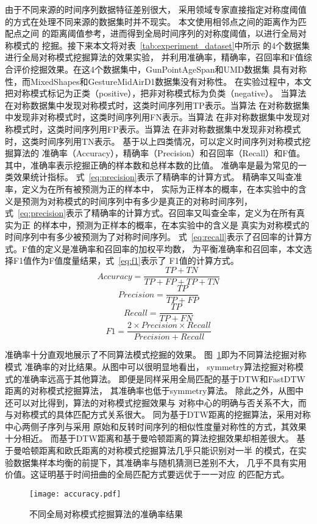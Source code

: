由于不同来源的时间序列数据特征差别很大，
采用领域专家直接指定对称度阈值的方式在处理不同来源的数据集时并不现实。
本文使用相邻点之间的距离作为匹配点之间
的距离阈值参考，进而得到全局时间序列的对称度阈值，以进行全局对称模式的
挖掘。接下来本文将对表~\ref{tab:experiment_dataset}中所示
的4个数据集进行全局对称模式挖掘算法的效果实验，
并利用准确率，精确率，召回率和F值综合评价挖掘效果。在这4个数据集中，GunPointAgeSpan和UMD数据集
具有对称性，而MixedShapes和GestureMidAirD1数据集没有对称性。
在实验过程中，本文把对称模式标记为正类（positive），把非对称模式标为负类（negative）。
当算法在对称数据集中发现对称模式时，这类时间序列用TP表示。当算法
在对称数据集中发现非对称模式时，这类时间序列用FN表示。当算法
在非对称数据集中发现对称模式时，这类时间序列用FP表示。当算法
在非对称数据集中发现非对称模式时，这类时间序列用TN表示。
基于以上四类情况，可以定义时间序列对称模式挖掘算法的
准确率（Accuracy），精确率（Precision）和召回率（Recall）和F值。
其中，准确率表示挖掘正确的样本数和总样本数的比值。
准确率是最为常见的一类效果统计指标。
式~\ref{eq:precision}表示了精确率的计算方式。
精确率又叫查准率，定义为在所有被预测为正的样本中，
实际为正样本的概率，在本实验中的含义是预测为对称模式的时间序列中有多少是真正的对称时间序列，
式~\ref{eq:precision}表示了精确率的计算方式。召回率又叫查全率，定义为在所有真实为正
的样本中，预测为正样本的概率，在本实验中的含义是
真实为对称模式的时间序列中有多少被预测为了对称时间序列。
式~\ref{eq:recall}表示了召回率的计算方式。F值的定义是准确率和召回率的加权平均数，
为平衡准确率和召回率，本文选择F1值作为F值度量结果，式~\ref{eq:f1}表示了
F1值的计算方式。
\begin{equation}
  Accuracy=\frac{TP+TN}{TP+FP+TP+TN}
  \label{eq:Accuracy}
\end{equation}
\begin{equation}
  Precision=\frac{TP}{TP+FP}
  \label{eq:precision}
\end{equation}
\begin{equation}
  Recall=\frac{TP}{TP+FN}
  \label{eq:recall}
\end{equation}
\begin{equation}
  F1=\frac{2 \times Precision \times Recall}{Precision+Recall}
  \label{eq:f1}
\end{equation}

准确率十分直观地展示了不同算法模式挖掘的效果。
图~\ref{fig:accuracy_compare}即为不同算法挖掘对称模式
准确率的对比结果。从图中可以很明显地看出，
symmetry算法挖掘对称模式的准确率远高于其他算法。
即便是同样采用全局匹配的基于DTW和FastDTW距离的对称模式挖掘算法，
其准确率也低于symmetry算法。
除此之外，从图中还可以对比得到，算法的对称模式挖掘效果与
对称中心的明确与否关系不大，而与对称模式的具体匹配方式关系很大。
同为基于DTW距离的挖掘算法，采用对称中心两侧子序列与采用
原始和反转时间序列的相似性度量对称性的方式，其效果十分相近。
而基于DTW距离和基于曼哈顿距离的算法挖掘效果却相差很大。
基于曼哈顿距离和欧氏距离的对称模式挖掘算法几乎只能识别对一半
的模式，在实验数据集样本均衡的前提下，其准确率与随机猜测已差别不大，
几乎不具有实用价值。这证明基于时间扭曲的全局匹配方式要远优于一一对应
的匹配方式。
\begin{figure}
  \centering
  \texttt{[image: accuracy.pdf]}
  \caption{不同全局对称模式挖掘算法的准确率结果}
  \label{fig:accuracy_compare}
\end{figure}

